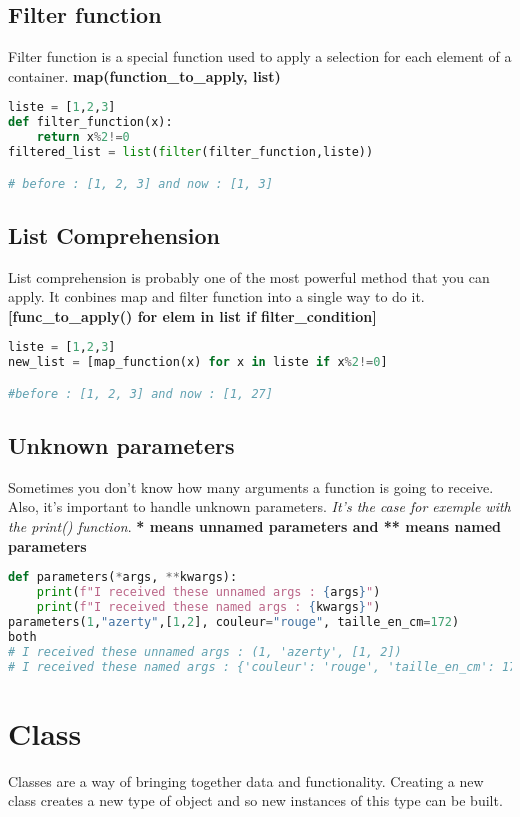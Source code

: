 \documentclass[a4paper, 12pt, titlepage]{scrartcl} %
\begin{document}
\subsection{Filter function}
Filter function is a special function used to apply a selection for each element of a container. \textbf{map(function\_to\_apply, list)}
\begin{lstlisting}[language=Python]
liste = [1,2,3]
def filter_function(x):
	return x%2!=0
filtered_list = list(filter(filter_function,liste))

# before : [1, 2, 3] and now : [1, 3]
\end{lstlisting}

\subsection{List Comprehension}
List comprehension is probably one of the most powerful method that you can apply. It conbines map and filter function into a single way to do it. \textbf{[func\_to\_apply() for elem in list if filter\_condition]}
\label{subsec:ListComprehension}
\begin{lstlisting}[language=Python]
liste = [1,2,3]
new_list = [map_function(x) for x in liste if x%2!=0]

#before : [1, 2, 3] and now : [1, 27]
\end{lstlisting}

\subsection{Unknown parameters}
Sometimes you don't know how many arguments a function is going to receive. Also, it's important to handle unknown parameters. \textit{It's the case for exemple with the print() function}. \textbf{* means unnamed parameters and ** means named parameters}
\begin{lstlisting}[language=Python]
def parameters(*args, **kwargs):
	print(f"I received these unnamed args : {args}")
	print(f"I received these named args : {kwargs}")
parameters(1,"azerty",[1,2], couleur="rouge", taille_en_cm=172)
both
# I received these unnamed args : (1, 'azerty', [1, 2])
# I received these named args : {'couleur': 'rouge', 'taille_en_cm': 172}
\end{lstlisting}

\newpage
\section{Class}
\label{sec:Class}
Classes are a way of bringing together data and functionality. Creating a new class creates a new type of object and so new instances of this type can be built.\newline
\end{document}
